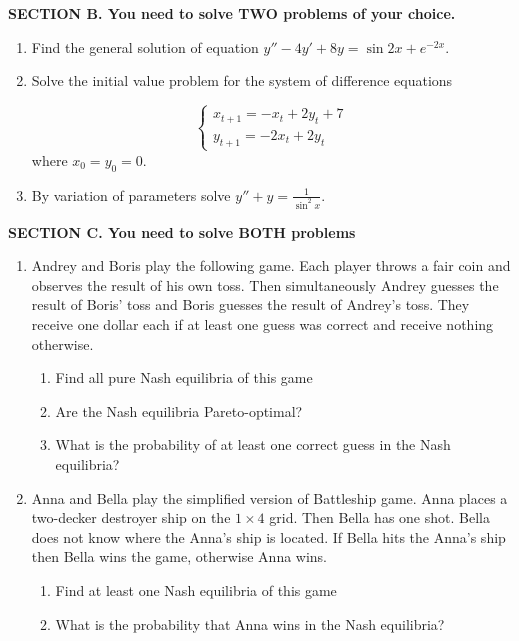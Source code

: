 \textbf{SECTION B. You need to solve TWO problems of your choice. }

\begin{enumerate}[resume]

\item Find the general solution of equation $y''-4y'+8y=\sin 2x + e^{-2x}$.

\item Solve the initial value problem for the system of difference equations

\[
\begin{cases}
x_{t+1}=-x_t+2y_t+7 \\
y_{t+1}=-2x_t+2y_t
\end{cases}
\]
where $x_0=y_0=0$.

\item By variation of parameters solve $y''+y=\frac{1}{\sin^2 x}$.

\end{enumerate}

\textbf{SECTION C. You need to solve BOTH problems }

\begin{enumerate}[resume]

\item Andrey and Boris play the following game. Each player throws a fair coin and observes the result of his own toss. Then simultaneously Andrey guesses the result of Boris' toss and Boris guesses the result of Andrey's toss. They receive one dollar each if at least one guess was correct and receive nothing otherwise.

\begin{enumerate}
\item Find all pure Nash equilibria of this game
\item Are the Nash equilibria Pareto-optimal?
\item What is the probability of at least one correct guess in the Nash equilibria?
\end{enumerate}

\item Anna and Bella play the simplified version of Battleship game. Anna places a two-decker destroyer ship on the $1\times 4$ grid. Then Bella has one shot. Bella does not know where the Anna's ship is located. If Bella hits the Anna's ship then Bella wins the game, otherwise Anna wins.

\begin{enumerate}
\item Find at least one Nash equilibria of this game
\item What is the probability that Anna wins in the Nash equilibria?
\end{enumerate}


\end{enumerate}

